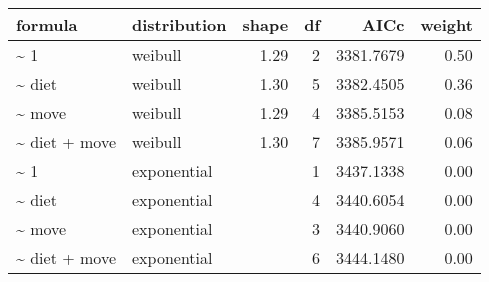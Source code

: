 \begin{table}[ht]
\centering
\begin{tabular}{llrrrr}
 formula & distribution & shape & df & AICc & weight \\ 
  \hline
\~{} 1 & weibull & 1.29 & 2 & 3381.7679 & 0.50 \\ 
  \~{} diet & weibull & 1.30 & 5 & 3382.4505 & 0.36 \\ 
  \~{} move & weibull & 1.29 & 4 & 3385.5153 & 0.08 \\ 
  \~{} diet + move & weibull & 1.30 & 7 & 3385.9571 & 0.06 \\ 
  \~{} 1 & exponential &  & 1 & 3437.1338 & 0.00 \\ 
  \~{} diet & exponential &  & 4 & 3440.6054 & 0.00 \\ 
  \~{} move & exponential &  & 3 & 3440.9060 & 0.00 \\ 
  \~{} diet + move & exponential &  & 6 & 3444.1480 & 0.00 \\ 
  \end{tabular}
\label{tab:erg}
\end{table}
